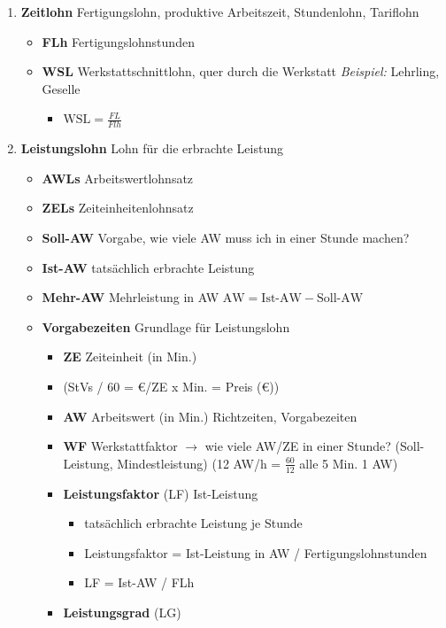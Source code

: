 \begin{enumerate}
\item
  \textbf{Zeitlohn} Fertigungslohn, produktive Arbeitszeit, Stundenlohn,
  Tariflohn

  \begin{itemize}
  \item
    \textbf{FLh} Fertigungslohnstunden
  \item
    \textbf{WSL} Werkstattschnittlohn, quer durch die Werkstatt
    \emph{Beispiel:} Lehrling, Geselle

    \begin{itemize}
    \item
      $\boxed{\text{WSL} = \frac{FL}{Flh}}$
    \end{itemize}
  \end{itemize}
\item
  \textbf{Leistungslohn} Lohn für die erbrachte Leistung

  \begin{itemize}
  \item
    \textbf{AWLs} Arbeitswertlohnsatz
  \item
    \textbf{ZELs} Zeiteinheitenlohnsatz
  \item
    \textbf{Soll-AW} Vorgabe, wie viele AW muss ich in einer Stunde
    machen?
  \item
    \textbf{Ist-AW} tatsächlich erbrachte Leistung
  \item
    \textbf{Mehr-AW} Mehrleistung in AW
    $\boxed{\text{AW} = \text{Ist-AW} - \text{Soll-AW}}$
  \item
    \textbf{Vorgabezeiten} Grundlage für Leistungslohn

    \begin{itemize}
    \item
      \textbf{ZE} Zeiteinheit (in Min.)
    \item
      (StVs / 60 = €/ZE x Min. = Preis (€))
    \item
      \textbf{AW} Arbeitswert (in Min.) Richtzeiten, Vorgabezeiten
    \item
      \textbf{WF} Werkstattfaktor $\to$ wie viele AW/ZE in einer
      Stunde? (Soll-Leistung, Mindestleistung) (12 AW/h =
      $\frac{60}{12}$ alle 5 Min. 1 AW)
    \item
      \textbf{Leistungsfaktor} (LF) Ist-Leistung

      \begin{itemize}
      \item
        tatsächlich erbrachte Leistung je Stunde
      \item
        Leistungsfaktor = Ist-Leistung in AW / Fertigungslohnstunden
      \item
        LF = Ist-AW / FLh
      \end{itemize}
    \item
      \textbf{Leistungsgrad} (LG)


\end{itemize}
\end{itemize}
\end{enumerate}
